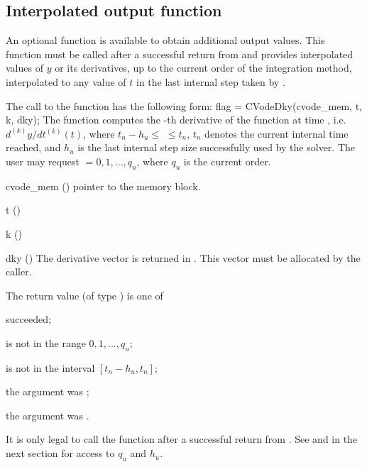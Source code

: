 
\subsection{Interpolated output function}\label{ss:optional_dky}

An optional function  is available to obtain additional output values.  
This function must be called after a successful return from  and provides 
interpolated values of $y$ or its derivatives, up to the current order of the 
integration method, interpolated to any value of $t$ in the last internal step 
taken by {\cvode}.

The call to the  function has the following form:
{
  flag = CVodeDky(cvode\_mem, t, k, dky);
}
{
  The function  computes the -th derivative of the  function at      
  time , i.e. $d^{(k)}y/dt^{(k)} (t)$, where $t_n - h_u \le$  $\le t_n$, 
  $t_n$ denotes the current internal time reached, and $h_u$ is the 
  last internal step size successfully used by the solver. 
  The user may request  $= 0, 1, ..., q_u$, where $q_u$ is the 
  current order. 
}
{
  \begin{args}
  \item[cvode\_mem] ()
    pointer to the {\cvode} memory block.
  \item[t] ()
  \item[k] ()
  \item[dky] ()
    The derivative vector is returned in . 
    This vector must be allocated by the caller. 
  \end{args}
}
{
  The return value  (of type ) is one of
  \begin{args} 
  \item[\Id{OKAY}]
     succeeded;
  \item[\Id{BAD\_K}] 
     is not in the range $0, 1, ..., q_u$;
  \item[\Id{BAD\_T}] 
     is not in the interval $[t_n - h_u , t_n]$;
  \item[\Id{BAD\_DKY}] 
    the  argument was ;
  \item[\Id{DKY\_NO\_MEM}] 
    the  argument was .
  \end{args}

}
{
  It is only legal to call the function  after a 
  successful return from . See  
  and  in the next section for access to 
  $q_u$ and $h_u$.
}

